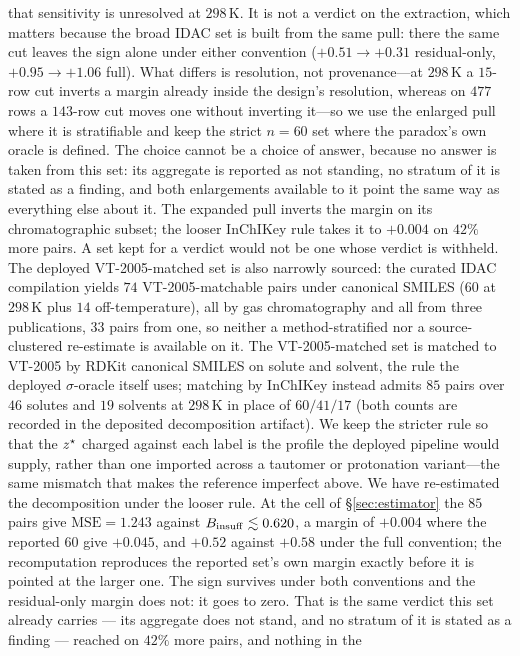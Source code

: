 that sensitivity is unresolved at $298$\,K. It is not a verdict on the extraction, which matters
because the broad IDAC set is built from the same pull: there the same cut leaves the sign alone
under either convention ($+0.51\to+0.31$ residual-only, $+0.95\to+1.06$ full). What differs is resolution,
not provenance---at $298$\,K a $15$-row cut inverts a margin already inside the design's resolution,
whereas on $477$ rows a $143$-row cut moves one without inverting it---so we use the enlarged pull
where it is stratifiable and keep the strict $n{=}60$ set where the paradox's own oracle is
defined. The choice cannot be a choice of answer, because no answer is taken from this set: its
aggregate is reported as not standing, no stratum of it is stated as a finding, and both
enlargements available to it point the same way as everything else about it. The expanded pull
inverts the margin on its chromatographic subset; the looser InChIKey rule takes it to $+0.004$ on
$42\%$ more pairs. A set kept for a verdict would not be one whose verdict is withheld. The deployed VT-2005-matched set is also narrowly sourced: the curated IDAC compilation yields $74$
VT-2005-matchable pairs under canonical SMILES ($60$ at $298$\,K plus $14$ off-temperature), all by
gas chromatography and all from three publications, $33$ pairs from one, so neither a
method-stratified nor a source-clustered re-estimate is available on it.
The VT-2005-matched set is matched to VT-2005 by RDKit canonical SMILES on solute and
solvent, the rule the deployed $\sigma$-oracle itself uses; matching by InChIKey instead admits $85$
pairs over $46$ solutes and $19$ solvents at $298$\,K in place of $60/41/17$ (both counts are recorded
in the deposited decomposition artifact). We keep the stricter rule so that the $z^\star$ charged against each
label is the profile the deployed pipeline would supply, rather than one imported across a tautomer or
protonation variant---the same mismatch that makes the reference imperfect above. We have re-estimated the decomposition under the looser rule. At the cell of
\S\ref{sec:estimator} the $85$ pairs give $\mathrm{MSE}=1.243$ against $B_{\mathrm{insuff}}\lesssim0.620$, a
margin of $+0.004$ where the reported $60$ give $+0.045$, and $+0.52$ against $+0.58$ under the full
convention; the recomputation reproduces the reported set's own margin exactly before it is pointed
at the larger one. The sign survives under both conventions and the residual-only margin does not:
it goes to zero. That is the same verdict this set already carries --- its aggregate does not stand,
and no stratum of it is stated as a finding --- reached on $42\%$ more pairs, and nothing in the
